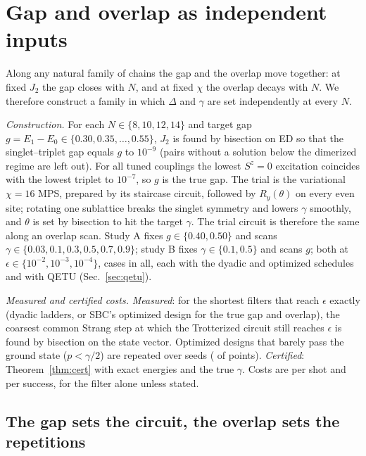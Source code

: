 \documentclass[aps,pra,twocolumn,superscriptaddress,nofootinbib]{revtex4-2}
\begin{document}
\section{Gap and overlap as independent inputs}
\label{sec:gapov}

Along any natural family of chains the gap and the overlap move together: at fixed $J_2$ the gap closes with $N$,
and at fixed $\chi$ the overlap decays with $N$. We therefore construct a family in which $\Delta$ and $\gamma$ are
set independently at every $N$.

\emph{Construction.} For each $N\in\{8,10,12,14\}$ and target gap $g=E_1-E_0\in\{0.30,0.35,\dots,0.55\}$, $J_2$
is found by bisection on ED so that the singlet--triplet gap equals $g$ to $10^{-9}$ (pairs without a solution
below the dimerized regime are left out). For all tuned couplings the lowest $S^z=0$ excitation coincides with the
lowest triplet to $10^{-7}$, so $g$ is the true gap. The trial is the variational $\chi=16$ MPS, prepared by its
staircase circuit, followed by $R_y(\theta)$ on every even site; rotating one sublattice breaks the singlet
symmetry and lowers $\gamma$ smoothly, and $\theta$ is set by bisection to hit the target $\gamma$. The trial
circuit is therefore the same along an overlap scan. Study A fixes $g\in\{0.40,0.50\}$ and scans
$\gamma\in\{0.03,0.1,0.3,0.5,0.7,0.9\}$; study B fixes $\gamma\in\{0.1,0.5\}$ and scans $g$; both at
$\epsilon\in\{10^{-2},10^{-3},10^{-4}\}$, \goNcases{} cases in all, each with the dyadic and optimized schedules
and with QETU (Sec.~\ref{sec:qetu}).

\emph{Measured and certified costs.} \emph{Measured}: for the shortest filters that reach $\epsilon$ exactly (dyadic
ladders, or SBC's optimized design for the true gap and overlap), the coarsest common Strang step at which the
Trotterized circuit still reaches $\epsilon$ is found by bisection on the state vector. Optimized designs that
barely pass the ground state ($p<\gamma/2$) are repeated over seeds (\optRetried{} of \optPoints{} points).
\emph{Certified}: Theorem~\ref{thm:cert} with exact energies and the true $\gamma$. Costs are per shot and per
success, for the filter alone unless stated.

\subsection{The gap sets the circuit, the overlap sets the repetitions}
\end{document}

